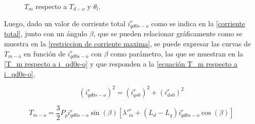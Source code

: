 \documentclass[a4paper, 10pt, onecolumn,journal]{ieeeconf}
\begin{document}
\begin{figure}[H]
    \centering
    \begin{adjustbox}{scale = 0.6}
    \end{adjustbox}
    \caption{$T_m$ respecto a $T_{d-o}$ y $\theta_l$.}
    \label{T_m en función de la posición y T_do}
\end{figure}

Luego, dado un valor de corriente total $i^{r}_{qd0s-o}$ como se indica en la \cref{corriente total}, junto con un
ángulo $\beta$, que se pueden relacionar
gráficamente como se muestra en la \cref{restriccion de corriente maxima}, se puede expresar
las curvas de $T_{m-o}$ en función de $i^{r}_{qd0s-o}$ con $\beta$ como parámetro, las que
se muestran en la \cref{T_m respecto a i_qd0s-o} y que responden a la \cref{ecuación T_m respecto a i_qd0s-o}.


\begin{equation}
    \left(i^{r}_{qd0s-o}\right)^2 = \left(i^{r}_{qs0}\right)^2 + \left(i^{r}_{ds0}\right)^2
    \label{corriente total}
\end{equation}

\begin{equation}
    T_{m-o} = \frac{3}{2} P_p i^r_{qd0s-o}\sin(\beta)\left[\lambda'^r_m + (L_d - L_q) i^r_{qd0s-o}\cos(\beta)\right]
    \label{ecuación T_m respecto a i_qd0s-o}
\end{equation}
\end{document}
